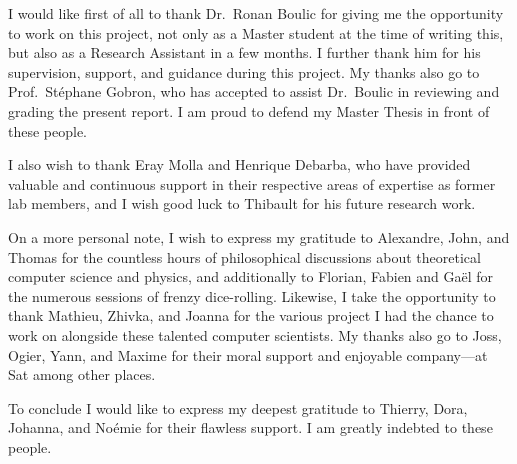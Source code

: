 \documentclass[
11pt, %
chapterinoneline,%
english, %
singlespacing, %
parskip, %
headsepline, %
]{MastersDoctoralThesis} %
\begin{document}

\begin{acknowledgements}
\addchaptertocentry{\acknowledgementname} %

I would like first of all to thank Dr.\ Ronan Boulic for giving me the opportunity to work on this project, not only as a Master student at the time of writing this, but also as a Research Assistant in a few months. I further thank him for his supervision, support, and guidance during this project. My thanks also go to Prof.\ St{\'e}phane Gobron, who has accepted to assist Dr.\ Boulic in reviewing and grading the present report. I am proud to defend my Master Thesis in front of these people.

I also wish to thank Eray Molla and Henrique Debarba, who have provided valuable and continuous support in their respective areas of expertise as former lab members, and I wish good luck to Thibault for his future research work.

On a more personal note, I wish to express my gratitude to Alexandre, John, and Thomas for the countless hours of philosophical discussions about theoretical computer science and physics, and additionally to Florian, Fabien and Ga{\"e}l for the numerous sessions of frenzy dice-rolling. Likewise, I take the opportunity to thank Mathieu, Zhivka, and Joanna for the various project I had the chance to work on alongside these talented computer scientists. My thanks also go to Joss, Ogier, Yann, and Maxime for their moral support and enjoyable company---at Sat among other places.

To conclude I would like to express my deepest gratitude to Thierry, Dora, Johanna, and No{\'e}mie for their flawless support. I am greatly indebted to these people.

\end{acknowledgements}


\tableofcontents %

\end{document}
